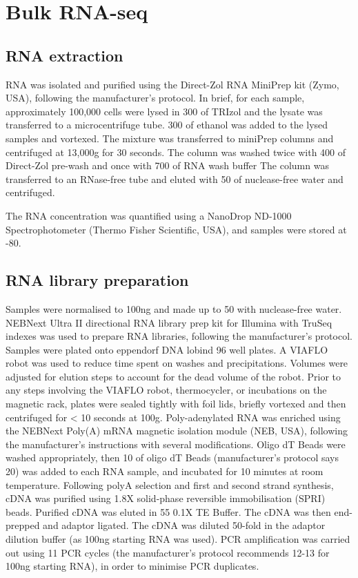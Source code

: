 \section{Bulk RNA-seq}\label{sec:bulk_lib_prep}
\subsection{RNA extraction}\label{subsec:rna_extraction}
RNA was isolated and purified using the Direct-Zol RNA MiniPrep kit (Zymo, USA), following the manufacturer's protocol.
In brief, for each sample, approximately 100,000 cells were lysed in 300\ul{} of TRIzol and the lysate was transferred to a microcentrifuge tube.
300\ul{} of ethanol was added to the lysed samples and vortexed.
The mixture was transferred to miniPrep columns and centrifuged at 13,000g for 30 seconds.
The column was washed twice with 400\ul{} of Direct-Zol pre-wash and once with 700\ul{} of RNA wash buffer
The column was transferred to an RNase-free tube and eluted with 50\ul{} of nuclease-free water and centrifuged.

The RNA concentration was quantified using a NanoDrop ND-1000 Spectrophotometer (Thermo Fisher Scientific, USA), and samples were stored at -80\C{}.

\subsection{RNA library preparation}
Samples were normalised to 100\si{\ng} and made up to 50\ul{} with nuclease-free water.
NEBNext\textsuperscript{\textregistered} Ultra II directional RNA library prep kit for Illumina\textsuperscript{\textregistered} with TruSeq indexes was used to prepare RNA libraries, following the manufacturer's protocol.
Samples were plated onto eppendorf DNA lobind 96 well plates.
A VIAFLO robot was used to reduce time spent on washes and precipitations.
Volumes were adjusted for elution steps to account for the dead volume of the robot.
Prior to any steps involving the VIAFLO robot, thermocycler, or incubations on the magnetic rack, plates were sealed tightly with foil lids, briefly vortexed and then centrifuged for < 10 seconds at 100g.
Poly-adenylated RNA was enriched using the NEBNext Poly(A) mRNA magnetic isolation module (NEB, USA), following the manufacturer's instructions with several modifications.
Oligo dT Beads were washed appropriately, then 10\ul{} of oligo dT Beads (manufacturer's protocol says 20\ul{}) was added to each RNA sample, and incubated for 10 minutes at room temperature.
Following polyA selection and first and second strand synthesis, cDNA was purified using 1.8X solid-phase reversible immobilisation (SPRI)
beads.
Purified cDNA was eluted in 55\ul{} 0.1X TE Buffer.
The cDNA was then end-prepped and adaptor ligated.
The cDNA was diluted 50-fold in the adaptor dilution buffer (as 100ng starting RNA was used).
PCR amplification was carried out using 11 PCR cycles (the manufacturer's protocol recommends 12-13 for 100ng starting RNA), in order to minimise PCR duplicates.

